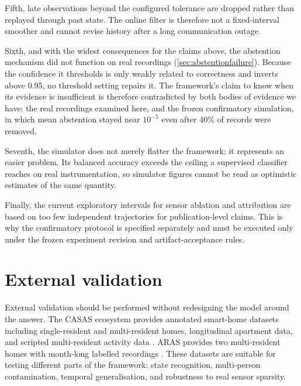 \documentclass[11pt]{article}
\begin{document}
Fifth, late observations beyond the configured tolerance are dropped rather than replayed through past state. The online filter is therefore not a fixed-interval smoother and cannot revise history after a long communication outage.

Sixth, and with the widest consequences for the claims above, the abstention mechanism did not function on
real recordings (\cref{sec:abstentionfailure}). Because the confidence it
thresholds is only weakly related to correctness and inverts above 0.95, no
threshold setting repairs it. The framework's claim to know when its evidence is
insufficient is therefore contradicted by both bodies of evidence we have: the
real recordings examined here, and the frozen confirmatory simulation, in which
mean abstention stayed near $10^{-5}$ even after 40\% of records were removed.

Seventh, the simulator does not merely flatter the framework; it represents an
easier problem. Its balanced accuracy exceeds the ceiling a supervised
classifier reaches on real instrumentation, so simulator figures cannot be read
as optimistic estimates of the same quantity.

Finally, the current exploratory intervals for sensor ablation and attribution
are based on too few independent trajectories for publication-level claims. This is why the confirmatory protocol is specified separately and must be executed only under the frozen experiment revision and artifact-acceptance rules.

\section{External validation}
\label{sec:external}

External validation should be performed without redesigning the model around the answer. The CASAS ecosystem provides annotated smart-home datasets including single-resident and multi-resident homes, longitudinal apartment data, and scripted multi-resident activity data \citep{cook2013casas}. ARAS provides two multi-resident homes with month-long labelled recordings \citep{alemdar2013aras}. These datasets are suitable for testing different parts of the framework: state recognition, multi-person contamination, temporal generalisation, and robustness to real sensor sparsity.
\end{document}
